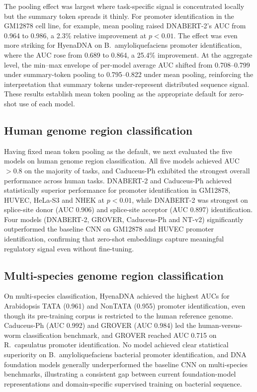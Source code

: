\documentclass[11pt,a4paper]{article}
\begin{document}
The pooling effect was largest where task-specific signal is concentrated locally but the summary token spreads it thinly. For promoter identification in the GM12878 cell line, for example, mean pooling raised DNABERT-2's AUC from 0.964 to 0.986, a 2.3\% relative improvement at $p < 0.01$. The effect was even more striking for HyenaDNA on B.~amyloliquefaciens promoter identification, where the AUC rose from 0.689 to 0.864, a 25.4\% improvement. At the aggregate level, the min--max envelope of per-model average AUC shifted from 0.708--0.799 under summary-token pooling to 0.795--0.822 under mean pooling, reinforcing the interpretation that summary tokens under-represent distributed sequence signal. These results establish mean token pooling as the appropriate default for zero-shot use of each model.

\subsection{Human genome region classification}
Having fixed mean token pooling as the default, we next evaluated the five models on human genome region classification. All five models achieved AUC $> 0.8$ on the majority of tasks, and Caduceus-Ph exhibited the strongest overall performance across human tasks. DNABERT-2 and Caduceus-Ph achieved statistically superior performance for promoter identification in GM12878, HUVEC, HeLa-S3 and NHEK at $p < 0.01$, while DNABERT-2 was strongest on splice-site donor (AUC 0.906) and splice-site acceptor (AUC 0.897) identification. Four models (DNABERT-2, GROVER, Caduceus-Ph and NT-v2) significantly outperformed the baseline CNN on GM12878 and HUVEC promoter identification, confirming that zero-shot embeddings capture meaningful regulatory signal even without fine-tuning.

\subsection{Multi-species genome region classification}
On multi-species classification, HyenaDNA achieved the highest AUCs for Arabidopsis TATA (0.961) and NonTATA (0.955) promoter identification, even though its pre-training corpus is restricted to the human reference genome. Caduceus-Ph (AUC 0.992) and GROVER (AUC 0.984) led the human-versus-worm classification benchmark, and GROVER reached AUC 0.715 on R.~capsulatus promoter identification. No model achieved clear statistical superiority on B.~amyloliquefaciens bacterial promoter identification, and DNA foundation models generally underperformed the baseline CNN on multi-species benchmarks, illustrating a consistent gap between current foundation-model representations and domain-specific supervised training on bacterial sequence.
\end{document}
